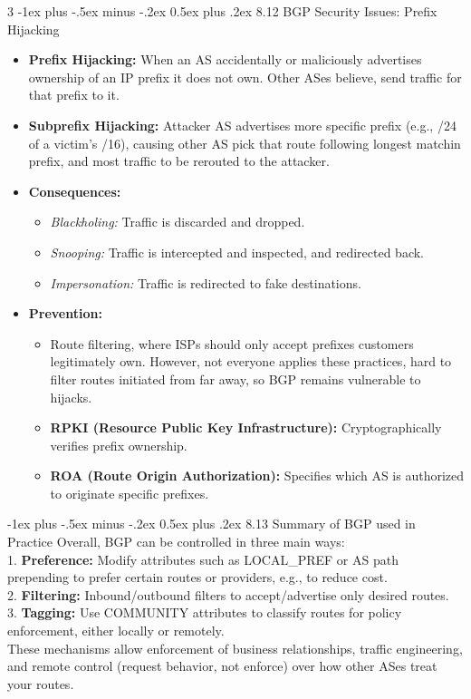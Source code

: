 \documentclass[a4paper, 9pt, landscape]{article}
\makeatletter
\renewcommand{\subsection}{\@startsection{subsubsection}{3}{0mm}%
                                {-1ex plus -.5ex minus -.2ex}%
                                {0.5ex plus .2ex}%
                                {\normalfont\small\bfseries}}
\makeatother
\begin{document}
\begin{multicols*}{3}
\subsection{8.12 BGP Security Issues: Prefix Hijacking}
\begin{itemize}
    \item \textbf{Prefix Hijacking:} When an AS accidentally or maliciously advertises ownership of an IP prefix it does not own. Other ASes believe, send traffic for that prefix to it.
    \item \textbf{Subprefix Hijacking:} Attacker AS advertises more specific prefix (e.g., /24 of a victim's /16), causing other AS pick that route following longest matchin prefix, and most traffic to be rerouted to the attacker.
    \item \textbf{Consequences:} 
    \begin{itemize}
        \item \textit{Blackholing:} Traffic is discarded and dropped.
        \item \textit{Snooping:} Traffic is intercepted and inspected, and redirected back.
        \item \textit{Impersonation:} Traffic is redirected to fake destinations.
    \end{itemize}
    \item \textbf{Prevention:}
    \begin{itemize}
        \item Route filtering, where ISPs should only accept prefixes customers legitimately own. However, not everyone applies these practices, hard to filter routes initiated from far away, so BGP remains vulnerable to hijacks.
        \item \textbf{RPKI (Resource Public Key Infrastructure):} Cryptographically verifies prefix ownership.
        \item \textbf{ROA (Route Origin Authorization):} Specifies which AS is authorized to originate specific prefixes.
    \end{itemize}
\end{itemize}

\subsection{8.13 Summary of BGP used in Practice}
Overall, BGP can be controlled in three main ways:  \\
1. \textbf{Preference:} Modify attributes such as LOCAL\_PREF or AS path prepending to prefer certain routes or providers, e.g., to reduce cost. \\
2. \textbf{Filtering:} Inbound/outbound filters to accept/advertise only desired routes.  \\
3. \textbf{Tagging:} Use COMMUNITY attributes to classify routes for policy enforcement, either locally or remotely. \\
These mechanisms allow enforcement of business relationships, traffic engineering, and remote control (request behavior, not enforce) over how other ASes treat your routes.



\end{multicols*}
\end{document}
